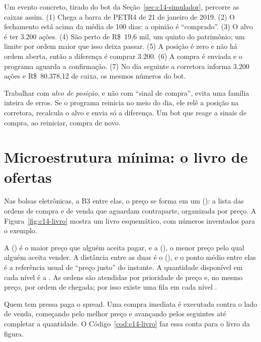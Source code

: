 Um evento concreto, tirado do bot da Seção~\ref{sec:c14-simulador}, percorre as caixas assim. (1) Chega a barra de PETR4 de 21 de janeiro de 2019. (2) O fechamento está acima da média de 100 dias: a opinião é ``comprado''. (3) O alvo é ter 3.200 ações. (4) São perto de R\$~19,6 mil, um quinto do patrimônio; um limite por ordem maior que isso deixa passar. (5) A posição é zero e não há ordem aberta, então a diferença é comprar 3.200. (6) A compra é enviada e o programa aguarda a confirmação. (7) No dia seguinte a corretora informa 3.200 ações e R\$~80.378,12 de caixa, os mesmos números do bot.

Trabalhar com \emph{alvo de posição}, e não com ``sinal de compra'', evita uma família inteira de erros. Se o programa reinicia no meio do dia, ele relê a posição na corretora, recalcula o alvo e envia só a diferença. Um bot que reage a sinais de compra, ao reiniciar, compra de novo.

\section{Microestrutura mínima: o livro de ofertas}

Nas bolsas eletrônicas, a B3 entre elas, o preço se forma em um  (): a lista das ordens de compra e de venda que aguardam contraparte, organizada por preço. A Figura~\ref{fig:c14-livro} mostra um livro esquemático, com números inventados para o exemplo.


A  () é o maior preço que alguém aceita pagar, e a  (), o menor preço pelo qual alguém aceita vender. A distância entre as duas é o  (), e o ponto médio entre elas é a referência usual de ``preço justo'' do instante. A quantidade disponível em cada nível é a . As ordens são atendidas por prioridade de preço e, no mesmo preço, por ordem de chegada; por isso existe uma fila em cada nível \citep{harris2003}.

Quem tem pressa paga o spread. Uma compra imediata é executada contra o lado de venda, começando pelo melhor preço e avançando pelos seguintes até completar a quantidade. O Código~\ref{cod:c14-livro} faz essa conta para o livro da figura.

